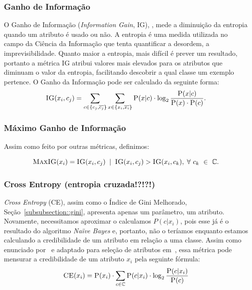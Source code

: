 \subsubsection{Ganho de Informação}
\label{subsubsection::ig}

O Ganho de Informação (\textit{Information Gain}, \textsc{IG}), \cite{Yang97}, mede a diminuição da entropia quando um atributo é usado ou não. A entropia é uma medida utilizada no campo da Ciência da Informação que tenta quantificar a desordem, a imprevisibilidade. Quanto maior a entropia, mais difícil é prever um resultado, portanto a métrica \textsc{IG} atribui valores mais elevados para os atributos que diminuam o valor da entropia, facilitando descobrir a qual classe um exemplo pertence. O Ganho da Informação pode ser calculado da seguinte forma:
\begin{equation}\label{eqn::ig}
 \textsc{IG}(x_i, c_j) = \sum_{c \in \{c_j, \overline{c_j}\}}\sum_{x \in \{x_i, \overline{x_i}\}} \textsc{P}(x|c) \cdot \log_2\frac{\textsc{P}(x|c)}{ \textsc{P}(x) \cdot \textsc{P}(c)}.
\end{equation}

\subsubsection{Máximo Ganho de Informação}
\label{subsubsection::maxig}

Assim como feito por outras métricas, definimos:

\begin{equation}\label{eqn::maxdom}
\textsc{MaxIG}(x_i) = \textsc{IG}(x_i,c_j) \; \; | \;\; \textsc{IG}(x_i, c_j) > \textsc{IG}(x_i, c_k), \; \forall\ c_k\ \in\ \mathbb{C}.
\end{equation}

\subsubsection{Cross Entropy (entropia cruzada!?!?!)}
\label{subsubsection::}

\textit{Cross Entropy} (\textsc{CE}), assim como o Índice de Gini Melhorado, Seção~\ref{subsubsection::gini}, apresenta apenas um parâmetro, um atributo. Novamente, necessitamos aproximar o calculamos $P(c|x_i)$, pois esse já é o resultado do algoritmo \textit{Naïve Bayes} e, portanto, não o teríamos enquanto estamos calculando a credibilidade de um atributo em relação a uma classe. Assim como enunciado por~\cite{Koller97} e adaptado para seleção de atributos em~\cite{Mladenic98}, essa métrica pode mensurar a credibilidade de um atributo $x_i$ pela seguinte fórmula:
\begin{equation}\label{eqn::ce}
 \textsc{CE}(x_i) =  \textsc{P}(x_i) \cdot \sum_{c \in \mathbb{C}} \textsc{P}(c|x_i) \cdot \log_2 \frac{ \textsc{P}(c|x_i) } {\textsc{P}(c) }
\end{equation}

